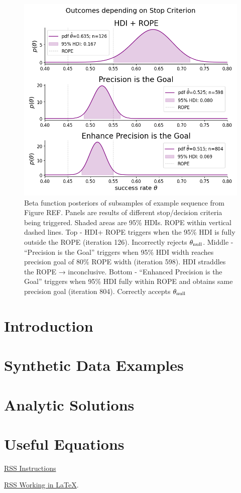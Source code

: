 \documentclass{article}
\begin{document}
\begin{figure}[h]
    \centering
    \includegraphics[width=1\textwidth]{cherry_posteriors.png}
    \caption{Beta function posteriors of subsamples of example sequence from Figure REF. Panels are results of different stop/decision criteria being triggered. Shaded areas are 95\% HDIs. ROPE within vertical dashed lines.
    Top - HDI+ ROPE triggers when the 95\% HDI is fully outside the ROPE (iteration 126). Incorrectly rejects $\theta_{\rm null}$. Middle - “Precision is the Goal” triggers when 95\% HDI width reaches precision goal of 80\% ROPE width (iteration 598). HDI straddles the ROPE → inconclusive.
    Bottom - “Enhanced Precision is the Goal” triggers when 95\% HDI fully within ROPE and obtains same precision goal (iteration 804). Correctly accepts $\theta_{\rm null}$}
\end{figure}

\section{Introduction}


\section{Synthetic Data Examples}

\section{Analytic Solutions}

\section{Useful Equations}


\href{https://academic.oup.com/rssdat/pages/general-instructions}{RSS Instructions} 

\href{https://academic.oup.com/pages/authoring/books/preparing-your-manuscript/working-in-latex}{RSS Working in \LaTeX}.


\end{document}
